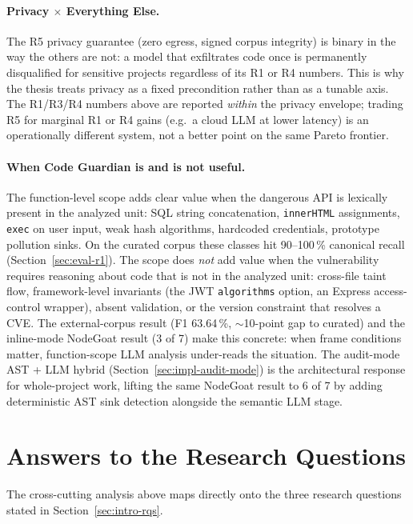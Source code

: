 \paragraph{Privacy $\times$ Everything Else.}
The R5 privacy guarantee (zero egress, signed corpus integrity) is binary in the way the others are not: a model that exfiltrates code once is permanently disqualified for sensitive projects regardless of its R1 or R4 numbers. This is why the thesis treats privacy as a fixed precondition rather than as a tunable axis. The R1/R3/R4 numbers above are reported \emph{within} the privacy envelope; trading R5 for marginal R1 or R4 gains (e.g.\ a cloud LLM at lower latency) is an operationally different system, not a better point on the same Pareto frontier.

\paragraph{When Code Guardian is and is not useful.}
The function-level scope adds clear value when the dangerous API is lexically present in the analyzed unit: SQL string concatenation, \texttt{innerHTML} assignments, \texttt{exec} on user input, weak hash algorithms, hardcoded credentials, prototype pollution sinks. On the curated corpus these classes hit 90--100\,\% canonical recall (Section~\ref{sec:eval-r1}). The scope does \emph{not} add value when the vulnerability requires reasoning about code that is not in the analyzed unit: cross-file taint flow, framework-level invariants (the JWT \texttt{algorithms} option, an Express access-control wrapper), absent validation, or the version constraint that resolves a CVE. The external-corpus result (F1 63.64\,\%, $\sim$10-point gap to curated) and the inline-mode NodeGoat result (3 of 7) make this concrete: when frame conditions matter, function-scope LLM analysis under-reads the situation. The audit-mode AST + LLM hybrid (Section~\ref{sec:impl-audit-mode}) is the architectural response for whole-project work, lifting the same NodeGoat result to 6 of 7 by adding deterministic AST sink detection alongside the semantic LLM stage.

\section{Answers to the Research Questions}
\label{sec:disc-rq-answers}

The cross-cutting analysis above maps directly onto the three research questions stated in Section~\ref{sec:intro-rqs}.

